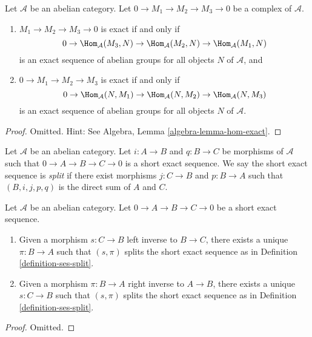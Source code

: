 \begin{lemma}
\label{lemma-check-exactness}
Let $\mathcal{A}$ be an abelian category.
Let $0 \to M_1 \to M_2 \to M_3 \to 0$ be a complex of $\mathcal{A}$.
\begin{enumerate}
\item $M_1 \to M_2 \to M_3 \to 0$ is exact if and only if
$$
0 \to \Hom_\mathcal{A}(M_3, N) \to
\Hom_\mathcal{A}(M_2, N) \to \Hom_\mathcal{A}(M_1, N)
$$
is an exact sequence of abelian groups for all objects $N$ of
$\mathcal{A}$, and
\item $0 \to M_1 \to M_2 \to M_3$ is exact if and only if
$$
0 \to \Hom_\mathcal{A}(N, M_1) \to \Hom_\mathcal{A}(N, M_2) \to
\Hom_\mathcal{A}(N, M_3)
$$
is an exact sequence of abelian groups for all objects $N$ of $\mathcal{A}$.
\end{enumerate}
\end{lemma}

\begin{proof}
Omitted. Hint: See
Algebra, Lemma \ref{algebra-lemma-hom-exact}.
\end{proof}

\begin{definition}
\label{definition-ses-split}
Let $\mathcal{A}$ be an abelian category.
Let $i : A \to B$ and $q : B \to C$ be morphisms
of $\mathcal{A}$ such that
$0 \to A \to B \to C \to 0$ is a short
exact sequence. We say the short exact
sequence is {\it split} if there exist
morphisms $j : C \to B$ and $p : B \to A$ such
that $(B, i, j, p, q)$ is the direct sum of $A$ and $C$.
\end{definition}

\begin{lemma}
\label{lemma-ses-split}
Let $\mathcal{A}$ be an abelian category.
Let $0 \to A \to B \to C \to 0$
be a short exact sequence.
\begin{enumerate}
\item Given a morphism $s : C \to B$ left inverse to
$B \to C$, there exists a unique $\pi : B \to A$
such that $(s, \pi)$ splits the short exact sequence
as in Definition \ref{definition-ses-split}.
\item Given a morphism $\pi : B \to A$ right inverse to
$A \to B$, there exists a unique $s : C \to B$
such that $(s, \pi)$ splits the short exact sequence
as in Definition \ref{definition-ses-split}.
\end{enumerate}
\end{lemma}

\begin{proof}
Omitted.
\end{proof}

